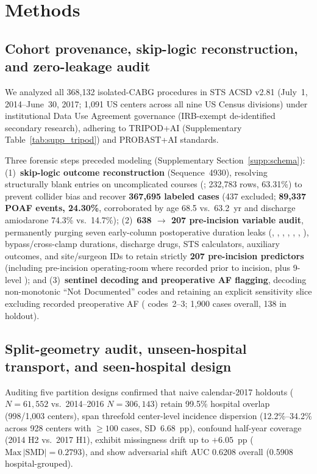 \section{Methods}
\label{sec:methods}

\subsection{Cohort provenance, skip-logic reconstruction, and zero-leakage audit}
We analyzed all 368,132 isolated-CABG procedures in STS ACSD v2.81 (July~1, 2014--June~30, 2017; 1,091 US centers across all nine US Census divisions)\cite{sts2014v281,shahian2018sts,obrien2018sts2} under institutional Data Use Agreement governance (IRB-exempt de-identified secondary research), adhering to TRIPOD+AI (Supplementary Table~\ref{tab:supp_tripod}) and PROBAST+AI standards.\cite{collins2024tripodai,moons2025probastai}

Three forensic steps preceded modeling (Supplementary Section~\ref{supp:schema}): (1)~\textbf{skip-logic outcome reconstruction} (Sequence~4930), resolving structurally blank  entries on uncomplicated courses (; 232,783 rows, 63.31\%) to prevent collider bias\cite{hernan2020causal} and recover \textbf{367,695 labeled cases} (437 excluded; \textbf{89,337 POAF events, 24.30\%}, corroborated by age 68.5 vs.\ 63.2~yr and discharge amiodarone 74.3\% vs.\ 14.7\%); (2)~\textbf{638 $\to$ 207 pre-incision variable audit}, permanently purging seven early-column postoperative duration leaks (, , , , , , ), bypass/cross-clamp durations, discharge drugs, STS calculators, auxiliary outcomes, and site/surgeon IDs to retain strictly \textbf{207 pre-incision predictors} (including pre-incision operating-room  where recorded prior to incision, plus 9-level ); and (3)~\textbf{sentinel decoding and preoperative AF flagging}, decoding non-monotonic ``Not Documented'' codes and retaining an explicit sensitivity slice excluding recorded preoperative AF ( codes~2--3; 1,900 cases overall, 138 in holdout).

\subsection{Split-geometry audit, unseen-hospital transport, and seen-hospital design}
Auditing five partition designs confirmed that naive calendar-2017 holdouts ($N=61{,}552$ vs.\ 2014--2016 $N=306{,}143$) retain 99.5\% hospital overlap (998/1,003 centers), span threefold center-level incidence dispersion (12.2\%--34.2\% across 928 centers with $\ge 100$ cases, SD~6.68~pp), confound half-year coverage (2014 H2 vs.\ 2017 H1), exhibit missingness drift up to $+6.05$~pp ($\mathrm{Max}\,|\mathrm{SMD}|=0.2793$), and show adversarial shift AUC 0.6208 overall (0.5908 hospital-grouped).

